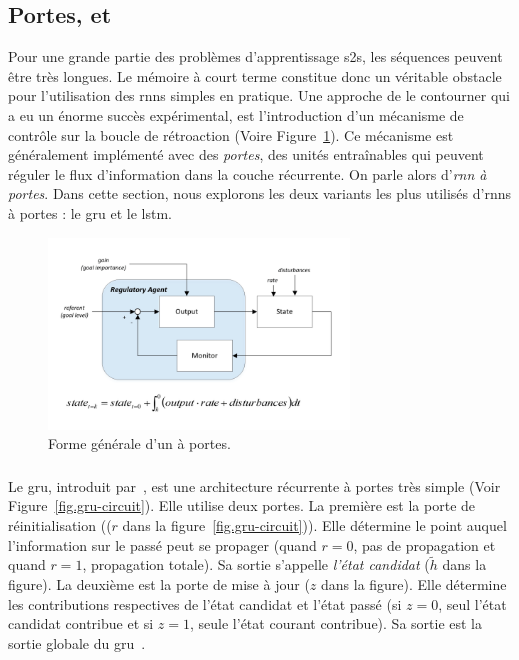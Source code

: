 \subsection{Portes,  et }

Pour une grande partie des problèmes d'apprentissage \gls{s2s}, les séquences peuvent être très longues.
Le mémoire à court terme constitue donc un véritable obstacle pour l'utilisation des \glspl{rnn} simples en pratique.
Une approche de le contourner qui a eu un énorme succès expérimental, 
est l'introduction d'un mécanisme de contrôle sur la boucle de rétroaction (Voire Figure~\ref{fig.rnn-gate}).
Ce mécanisme est généralement implémenté avec des \emph{portes},
des unités entraînables qui peuvent réguler le flux d'information dans la couche récurrente.
On parle alors d'\emph{\gls{rnn} à portes}.
Dans cette section, nous explorons les deux variants les plus utilisés d'\glspl{rnn} à portes :
le \gls{gru} et le \gls{lstm}. 


\begin{figure}[htb]
    \begin{center}
        \includegraphics[width=8cm]{assets/images/gated-feedback.png}
    \end{center}
    \caption{Forme générale d'un  à portes.}
    \label{fig.rnn-gate}
\end{figure}

\subsubsection{}

Le \gls{gru}, introduit par~\cite{Cho_van_Merrienboer_Bahdanau_Bengio_2014}, 
est une architecture récurrente à portes très simple (Voir Figure~\ref{fig.gru-circuit}).
Elle utilise deux portes.
La première est la porte de réinitialisation ((\(r\) dans la figure~\ref{fig.gru-circuit})).
Elle détermine le point auquel l'information sur le passé peut se propager
(quand \(r=0\), pas de propagation et quand \(r=1\), propagation totale).
Sa sortie s'appelle \emph{l'état candidat} (\(\tilde{h}\) dans la figure).
La deuxième est la porte de mise à jour (\(z\) dans la figure).
Elle détermine les contributions respectives de l'état candidat et l'état passé
(si \(z=0\), seul l'état candidat contribue et si \(z=1\), seule l'état courant contribue).
Sa sortie est la sortie globale du \gls{gru}~\cite{Cho_van_Merrienboer_Bahdanau_Bengio_2014}.


